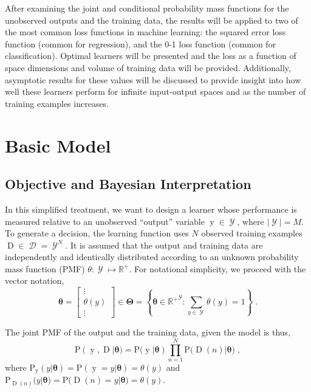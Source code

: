 \documentclass[12pt]{report}
\DeclareMathOperator{\yrm}{\mathrm{y}}
\DeclareMathOperator{\Drm}{\mathrm{D}}
\DeclareMathOperator{\Ycal}{\mathcal{Y}}
\DeclareMathOperator{\Dcal}{\mathcal{D}}
\begin{document}
After examining the joint and conditional probability mass functions for the unobserved outputs and the training data, the results will be applied to two of the most common loss functions in machine learning: the squared error loss function (common for regression), and the 0-1 loss function (common for classification). Optimal learners will be presented and the loss as a function of space dimensions and volume of training data will be provided. Additionally, asymptotic results for these values will be discussed to provide insight into how well these learners perform for infinite input-output spaces and as the number of training examples increases. 




\section{Basic Model}


\subsection{Objective and Bayesian Interpretation}

In this simplified treatment, we want to design a learner whose performance is measured relative to an unobserved ``output'' variable $\yrm \in \Ycal$, where $|\Ycal| = M$. To generate a decision, the learning function uses $N$ observed training examples $\Drm \in \Dcal = \Ycal^N$. It is assumed that the output and training data are independently and identically distributed according to an unknown probability mass function (PMF) $\theta: \Ycal \mapsto \mathbb{R}^+$. For notational simplicity, we proceed with the vector notation, 
\begin{equation}
\bm{\theta} = \begin{bmatrix} \vdots \\ \theta(y) \\ \vdots \end{bmatrix} \in \bm{\Theta} 
= \left\{ \bm{\theta} \in {\mathbb{R}^+}^{\Ycal}: \sum_{y \in \Ycal} \theta(y) = 1 \right\} \;.
\end{equation}

The joint PMF of the output and the training data, given the model is thus,
\begin{equation}
\text{P}(\yrm,\Drm | \bm{\theta}) = \text{P}(\yrm | \bm{\theta}) \prod_{n=1}^N \text{P}\big( \Drm(n) | \bm{\theta} \big) \;,
\end{equation}
where $\text{P}_{\yrm}(y|\bm{\theta}) = \text{P}(\yrm = y | \bm{\theta}) = \theta(y)$ and $\text{P}_{\Drm(n)}(y|\bm{\theta}) = \text{P}\big( \Drm(n) = y | \bm{\theta} \big) = \theta(y)$.
\end{document}
